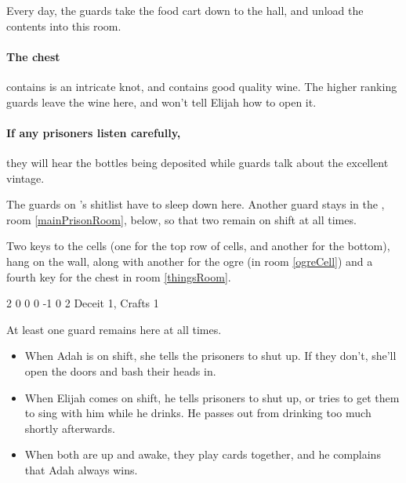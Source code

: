 \begin{multicols}{2}
\label{dunStorage}

Every day, the guards take the food cart down to the hall, and unload the contents into this room.

\paragraph{The chest}
contains is an intricate knot, and contains good quality wine.
The higher ranking guards leave the wine here, and won't tell Elijah how to open it.

\paragraph{If any prisoners listen carefully,}
they will hear the bottles being deposited while guards talk about the excellent vintage.

\label{guardStationRoom}

The guards on 's shitlist have to sleep down here.
Another guard stays in the , room \ref{mainPrisonRoom}, below, so that two remain on shift at all times.

Two keys to the cells (one for the top row of cells, and another for the bottom), hang on the wall, along with another for the ogre (in room \ref{ogreCell}) and a fourth key for the chest in room \ref{thingsRoom}.

{2}%
{0}%
{{0}%
{0}%
{-1}}%
{0}%
{2}%
{
  Deceit 1, Crafts 1
  \knacks{\brawler, \berserker}
}%
{\shortsword}%
{}


\label{mainPrisonRoom}

At least one guard remains here at all times.
\begin{itemize}

  \item
  When Adah is on shift, she tells the prisoners to shut up.
  If they don't, she'll open the doors and bash their heads in.
  \item
  When Elijah comes on shift, he tells prisoners to shut up, or tries to get them to sing with him while he drinks.
  He passes out from drinking too much shortly afterwards.
  \item
  When both are up and awake, they play cards together, and he complains that Adah always wins.


\end{itemize}
\end{multicols}
